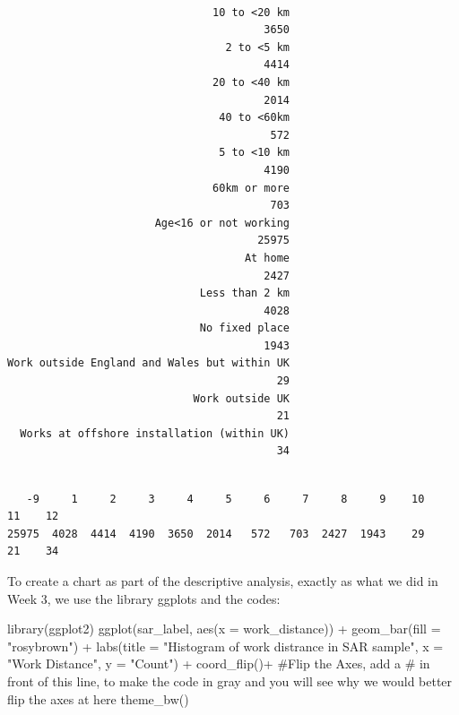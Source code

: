 \documentclass[
  letterpaper,
  DIV=11,
  numbers=noendperiod]{scrreprt}
\newenvironment{Shaded}{\begin{snugshade}}{\end{snugshade}}
\newcommand{\AttributeTok}[1]{\textcolor[rgb]{0.40,0.45,0.13}{#1}}
\newcommand{\CommentTok}[1]{\textcolor[rgb]{0.37,0.37,0.37}{#1}}
\newcommand{\FunctionTok}[1]{\textcolor[rgb]{0.28,0.35,0.67}{#1}}
\newcommand{\NormalTok}[1]{\textcolor[rgb]{0.00,0.23,0.31}{#1}}
\newcommand{\SpecialCharTok}[1]{\textcolor[rgb]{0.37,0.37,0.37}{#1}}
\newcommand{\StringTok}[1]{\textcolor[rgb]{0.13,0.47,0.30}{#1}}
\begin{document}
\begin{verbatim}

                                10 to <20 km 
                                        3650 
                                  2 to <5 km 
                                        4414 
                                20 to <40 km 
                                        2014 
                                 40 to <60km 
                                         572 
                                 5 to <10 km 
                                        4190 
                                60km or more 
                                         703 
                       Age<16 or not working 
                                       25975 
                                     At home 
                                        2427 
                              Less than 2 km 
                                        4028 
                              No fixed place 
                                        1943 
Work outside England and Wales but within UK 
                                          29 
                             Work outside UK 
                                          21 
  Works at offshore installation (within UK) 
                                          34 
\end{verbatim}

\begin{Shaded}
\end{Shaded}

\begin{verbatim}

   -9     1     2     3     4     5     6     7     8     9    10    11    12 
25975  4028  4414  4190  3650  2014   572   703  2427  1943    29    21    34 
\end{verbatim}

To create a chart as part of the descriptive analysis, exactly as what
we did in Week 3, we use the library ggplots and the codes:

\begin{Shaded}
\begin{Highlighting}[]
\FunctionTok{library}\NormalTok{(ggplot2)}
\FunctionTok{ggplot}\NormalTok{(sar\_label, }\FunctionTok{aes}\NormalTok{(}\AttributeTok{x =}\NormalTok{ work\_distance)) }\SpecialCharTok{+} 
  \FunctionTok{geom\_bar}\NormalTok{(}\AttributeTok{fill =} \StringTok{"rosybrown"}\NormalTok{) }\SpecialCharTok{+} 
  \FunctionTok{labs}\NormalTok{(}\AttributeTok{title =} \StringTok{"Histogram of work distrance in SAR sample"}\NormalTok{, }\AttributeTok{x =} \StringTok{"Work Distance"}\NormalTok{, }\AttributeTok{y =} \StringTok{"Count"}\NormalTok{) }\SpecialCharTok{+}
  \FunctionTok{coord\_flip}\NormalTok{()}\SpecialCharTok{+} \CommentTok{\#Flip the Axes, add a \# in front of this line, to make the code in gray and you will see why we would better flip the axes at here}
  \FunctionTok{theme\_bw}\NormalTok{() }
\end{Highlighting}
\end{Shaded}
\end{document}
